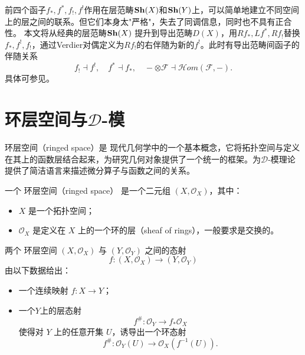 \documentclass[12pt,a4paper]{ctexrep}   %
\begin{document}
前四个函子$f_*,f^*,f_!,f^!$作用在层范畴$\mathbf{Sh}(X)$和$\mathbf{Sh}(Y)$上，可以简单地建立不同空间上的层之间的联系。但它们本身太"严格"，失去了同调信息，同时也不具有正合性。
本文将从经典的层范畴$\mathbf{Sh}(X)$ 提升到导出范畴$D(X)$，用$Rf_*, Lf^*, Rf_!$替换$f_*,f^!,f_!$，通过Verdier对偶定义为$Rf_!$的右伴随为新的$f^!$。此时有导出范畴间函子的伴随关系
\begin{equation*}
    f_! \dashv f^!,\quad f^* \dashv f_*,\quad -\otimes  \mathcal{F}\dashv \mathcal{H}om(\mathcal{F},-).
\end{equation*}
具体可参见\cite{gallauer2021introduction}。




\section{环层空间与$\mathcal{D}$-模}
环层空间（ringed space）是 现代几何学中的一个基本概念，它将拓扑空间与定义在其上的函数层结合起来，为研究几何对象提供了一个统一的框架。为$\mathcal{D}$-模理论提供了简洁语言来描述微分算子与函数之间的关系。


\begin{definition}
    一个 环层空间（ringed space） 是一个二元组 $(X,\mathcal{O}_X)$，其中：
    \begin{itemize}
        \item $X$ 是一个拓扑空间；
        \item $\mathcal{O}_X$ 是定义在 $X$ 上的一个环的层（sheaf of rings），一般要求是交换的。
    \end{itemize}
\end{definition}


\begin{definition}
    两个 环层空间 $(X,\mathcal{O}_X)$ 与 $(Y,\mathcal{O}_Y)$ 之间的态射
    \begin{equation*}
        f: (X,\mathcal{O}_X) \to (Y,\mathcal{O}_Y)
    \end{equation*}
    由以下数据给出：
    \begin{itemize}
        \item 一个连续映射 $f: X \to Y$；
        \item 一个$Y$上的层态射
              \[
                  f^\#: \mathcal{O}_Y \to f_* \mathcal{O}_X
              \]
              使得对 $Y$ 上的任意开集 $U$，诱导出一个环态射
              \[
                  f^\#: \mathcal{O}_Y(U) \to \mathcal{O}_X(f^{-1}(U)).
              \]
    \end{itemize}
\end{definition}
\end{document}

